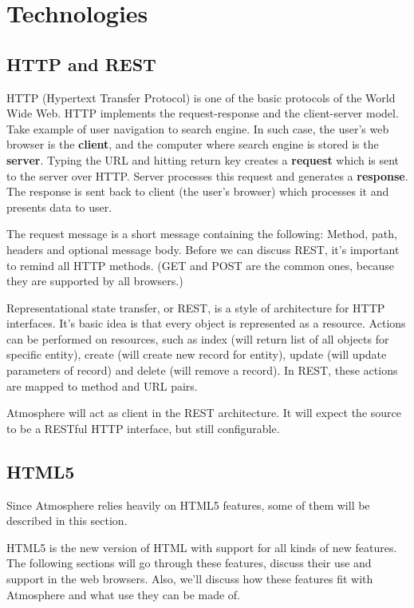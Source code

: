 \section{Technologies}

\subsection{HTTP and REST}

HTTP (Hypertext Transfer Protocol) is one of the basic protocols of the World Wide Web. HTTP implements the request-response and the client-server model. Take example of user navigation to search engine. In such case, the user's web browser is the \textbf{client}, and the computer where search engine is stored is the \textbf{server}. Typing the URL and hitting return key creates a \textbf{request} which is sent to the server over HTTP. Server processes this request and generates a \textbf{response}. The response is sent back to client (the user's browser) which processes it and presents data to user.

The request message is a short message containing the following: Method, path, headers and optional message body. Before we can discuss REST, it’s important to remind all HTTP methods. (GET and POST are the common ones, because they are supported by all browsers.)

Representational state transfer, or REST, is a style of architecture for HTTP interfaces. It's basic idea is that every object is represented as a resource. Actions can be performed on resources, such as index (will return list of all objects for specific entity), create (will create new record for entity), update (will update parameters of record) and delete (will remove a record). In REST, these actions are mapped to method and URL pairs. \citep{rails_way}

Atmosphere will act as client in the REST architecture. It will expect the source to be a RESTful HTTP interface, but still configurable. 

\subsection{HTML5}

Since Atmosphere relies heavily on HTML5 features, some of them will be described in this section. 

HTML5 is the new version of HTML with support for all kinds of new features. The following sections will go through these features, discuss their use and support in the web browsers. Also, we’ll discuss how these features fit with Atmosphere and what use they can be made of.

